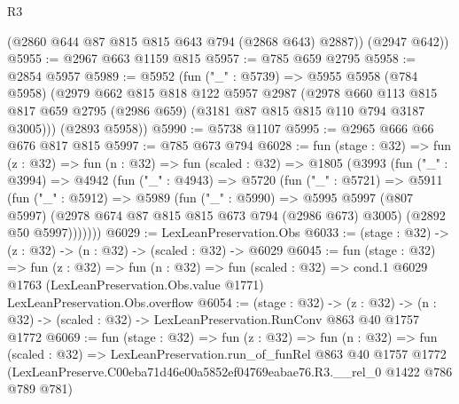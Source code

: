 \begin{lexlean}{R3}
\begin{coremodule}
        (@2860 @644 @87 @815 @815 @643 @794 (@2868 @643) @2887))
      (@2947 @642))
@5955 := @2967 @663 @1159 @815
@5957 := @785 @659 @2795
@5958 := @2854 @5957
@5989 := @5952
    (fun ("_" : @5739) =>
    @5955
      @5958
      (@784 @5958)
      (@2979
        @662
        @815
        @818
        @122
        @5957
        @2987
        (@2978
          @660
          @113
          @815
          @817
          @659
          @2795
          (@2986 @659)
          (@3181 @87 @815 @815 @110 @794 @3187 @3005)))
      (@2893 @5958))
@5990 := @5738 @1107
@5995 := @2965 @666 @66 @676 @817 @815
@5997 := @785 @673 @794
@6028 := fun (stage : @32) =>
  fun (z : @32) =>
  fun (n : @32) =>
  fun (scaled : @32) =>
  @1805
    (@3993
      (fun ("_" : @3994) =>
      @4942
        (fun ("_" : @4943) =>
        @5720
          (fun ("_" : @5721) =>
          @5911
            (fun ("_" : @5912) =>
            @5989
              (fun ("_" : @5990) =>
              @5995
                @5997
                (@807 @5997)
                (@2978 @674 @87 @815 @815 @673 @794 (@2986 @673) @3005)
                (@2892 @50 @5997)))))))
@6029 := LexLeanPreservation.Obs
@6033 := (stage : @32) -> (z : @32) -> (n : @32) -> (scaled : @32) -> @6029
@6045 := fun (stage : @32) =>
  fun (z : @32) =>
  fun (n : @32) =>
  fun (scaled : @32) =>
  cond.{1} @6029 @1763 (LexLeanPreservation.Obs.value @1771) LexLeanPreservation.Obs.overflow
@6054 := (stage : @32) ->
  (z : @32) -> (n : @32) -> (scaled : @32) -> LexLeanPreservation.RunConv @863 @40 @1757 @1772
@6069 := fun (stage : @32) =>
  fun (z : @32) =>
  fun (n : @32) =>
  fun (scaled : @32) =>
  LexLeanPreservation.run_of_funRel
    @863
    @40
    @1757
    @1772
    (LexLeanPreserve.C00eba71d46e00a5852ef04769eabae76.R3.__rel_0 @1422 @786 @789 @781)
\end{coremodule}
\end{lexlean}
